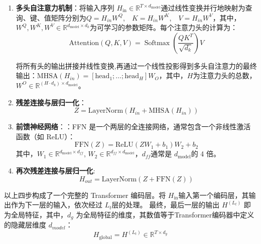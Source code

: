 \documentclass{setp-new}
\begin{document}
\begin{enumerate}
    \item \textbf{多头自注意力机制}：将输入序列 $H_{\text{in}} \in \mathbb{R}^{T \times d_{\text{model}}}$通过线性变换并行地映射为查询、键、值矩阵分别为$Q = H_{in}W^Q$,$\quad K = H_{in}W^K$,$\quad V = H_{in}W^V$，其中，$W^Q, W^K, W^V \in \mathbb{R}^{d_{\text{model}} \times d_k}$为可学习的参数矩阵。每个注意力头的计算为：
    \begin{equation}
    \text{Attention}\left(Q, K, V\right) = \operatorname{Softmax}\left(\frac{QK^T}{\sqrt{d_k}}\right) V
    \end{equation}
    
    将所有头的输出拼接并线性变换,再通过一个线性投影得到多头自注意力的最终输出：$\text{MHSA}(H_{in}) = [\text{head}_1; \dots; \text{head}_H] W_O$，其中，$H$为注意力头的总数，$W^O \in \mathbb{R}^{(H \cdot d_k) \times d_{\text{model}}}$。
    
    \item \textbf{残差连接与层归一化}：
    \begin{equation}
    Z = \text{LayerNorm}(H_{in}+ \text{MHSA}(H_{in}))
   \end{equation}
   
    \item \textbf{前馈神经网络}：：FFN 是一个两层的全连接网络，通常包含一个非线性激活函数（如 ReLU）：
    \begin{equation}
    \text{FFN}(Z) = \text{ReLU}(Z W_1 + b_1) W_2 + b_2
    \end{equation}
    其中，$W_1 \in \mathbb{R}^{d_{\text{model}} \times d_{ff}}$, $W_2 \in \mathbb{R}^{d_{ff} \times d_{\text{model}}}$，$d_{ff}$通常是 $d_{\text{model}}$的 4 倍。
    
    \item \textbf{再次残差连接与层归一化}:
    \begin{equation}
    H_{out} = \text{LayerNorm}(Z + \text{FFN}(Z))
    \end{equation}
\end{enumerate}

以上四步构成了一个完整的 Transformer 编码层。将 $H_{\text{in}}$输入第一个编码层，其输出作为下一层的输入，依次经过 $L_t$层的处理。
最终，最后一层的输出 $H^{(L_t)}$ 即为全局特征，其中，$d_g$ 为全局特征的维度，其数值等于Transformer编码器中定义的隐藏层维度 $d_{model}$：
\begin{equation}
H_{\text{global}} = H^{(L_t)} \in \mathbb{R}^{T \times d_g}
\end{equation}
\end{document}
